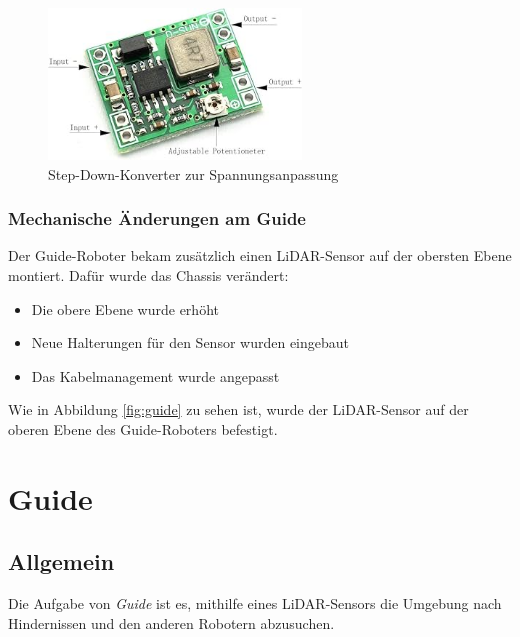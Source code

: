 \begin{figure}[H]
    \centering
    \includegraphics[width=0.6\textwidth]{img/Hardware/stepdown.png}
    \caption{Step-Down-Konverter zur Spannungsanpassung}
    \label{fig:stepdown}
\end{figure}

\subsubsection{Mechanische Änderungen am Guide}
Der Guide-Roboter bekam zusätzlich einen LiDAR-Sensor auf der obersten Ebene montiert.
%
Dafür wurde das Chassis verändert:
\begin{itemize}
    \item Die obere Ebene wurde erhöht
    \item Neue Halterungen für den Sensor wurden eingebaut
    \item Das Kabelmanagement wurde angepasst
\end{itemize}
Wie in Abbildung \ref{fig:guide} zu sehen ist,
wurde der LiDAR-Sensor auf der oberen Ebene des Guide-Roboters befestigt.





\section{Guide}
\label{subsec:hardware_guide}
\subsection{Allgemein}
Die Aufgabe von \textit{Guide} ist es,
mithilfe eines LiDAR-Sensors die Umgebung nach Hindernissen und den anderen Robotern abzusuchen.

